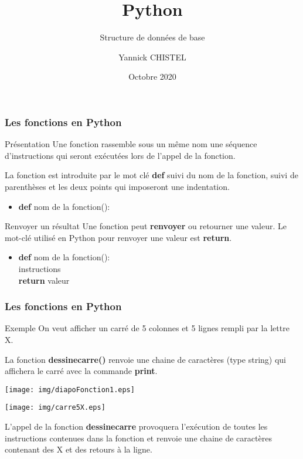 \documentclass[9pt]{beamer}
\title{Python}
\subtitle{Structure de données de base}
\author{Yannick CHISTEL}
\institute{Lycée Dumont d'Urville - CAEN}
\date{Octobre 2020}
\begin{document}
 
\frame{\titlepage}

\begin{frame}
\frametitle{Les fonctions en Python}

\begin{block}{Présentation}
Une fonction rassemble sous un même nom une séquence d'instructions qui seront exécutées lors de l'appel de la fonction. \medskip

La fonction est introduite par le mot clé \textbf{def} suivi du nom de la fonction, suivi de parenthèses et les deux points qui imposeront une indentation.
\begin{itemize}
\item \textbf{def} nom de la fonction():
\end{itemize}
\end{block}

\begin{block}{Renvoyer un résultat}
Une fonction peut \textbf{renvoyer} ou retourner une valeur. Le mot-clé utilisé en Python pour renvoyer une valeur est \textbf{return}.
\begin{itemize}
\item \textbf{def} nom de la fonction():\\
\hspace{0.5cm} instructions\\
\hspace{0.5cm} \textbf{return} valeur
\end{itemize}
\end{block}
\end{frame}


\begin{frame}
\frametitle{Les fonctions en Python}
\begin{exampleblock}{Exemple}
On veut afficher un carré de 5 colonnes et 5 lignes rempli par la lettre X.\medskip

La fonction \textbf{dessinecarre()} renvoie une chaine de caractères (type string) qui affichera le carré avec la commande \textbf{print}.\medskip

\begin{minipage}{0.6\textwidth}
\texttt{[image: img/diapoFonction1.eps]}
\end{minipage}
\begin{minipage}{0.35\textwidth}
\texttt{[image: img/carre5X.eps]}
\end{minipage}\medskip

L'appel de la fonction \textbf{dessinecarre} provoquera l'exécution de toutes les instructions contenues dans la fonction et renvoie une chaine de caractères contenant des X et des retours à la ligne.
\end{exampleblock}
\end{frame}
\end{document}
